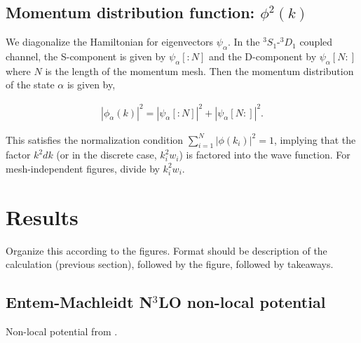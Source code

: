 \documentclass[preprintnumbers,floatfix,aps,prc,preprint,nofootinbib]{revtex4-1}
\begin{document}
\subsection{Momentum distribution function: $\phi^2(k)$}
\label{sec:momentum_dist_funcs}


We diagonalize the Hamiltonian for eigenvectors $\psi_{\alpha}$. In the $^{3}S_1$-$^{3}D_1$ coupled channel, the S-component is given by $\psi_{\alpha}[:N]$ and the D-component by $\psi_{\alpha}[N:]$ where $N$ is the length of the momentum mesh. Then the momentum distribution of the state $\alpha$ is given by,

\begin{eqnarray}
	\label{eq:momentum_distribution}
	|\phi_{\alpha}(k)|^2 = |\psi_{\alpha}[:N]|^2 + |\psi_{\alpha}[N:]|^2.
\end{eqnarray}

This satisfies the normalization condition $\sum_{i=1}^N |\phi(k_i)|^2 = 1$, implying that the factor $k^2 dk$ (or in the discrete case, $k_i^2 w_i$) is factored into the wave function. For mesh-independent figures, divide by $k_i^2 w_i$.


\section{Results}
\label{sec:results}


Organize this according to the figures. Format should be description of the calculation (previous section), followed by the figure, followed by takeaways.


\subsection{Entem-Machleidt N$^3$LO non-local potential}
\label{sec:nonlocal_results}


Non-local potential from \cite{Entem:2003ft}.
\end{document}
